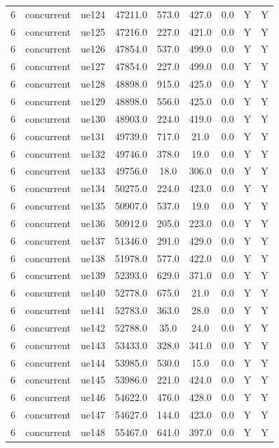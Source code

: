\begin{table}[ht]
\begin{tabular}{|c|c|c|c|c|c|c|c|c|}
6 & concurrent & ue124 & 47211.0 & 573.0 & 427.0 & 0.0 & Y & Y \\
6 & concurrent & ue125 & 47216.0 & 227.0 & 421.0 & 0.0 & Y & Y \\
6 & concurrent & ue126 & 47854.0 & 537.0 & 499.0 & 0.0 & Y & Y \\
6 & concurrent & ue127 & 47854.0 & 227.0 & 499.0 & 0.0 & Y & Y \\
6 & concurrent & ue128 & 48898.0 & 915.0 & 425.0 & 0.0 & Y & Y \\
6 & concurrent & ue129 & 48898.0 & 556.0 & 425.0 & 0.0 & Y & Y \\
6 & concurrent & ue130 & 48903.0 & 224.0 & 419.0 & 0.0 & Y & Y \\
6 & concurrent & ue131 & 49739.0 & 717.0 & 21.0 & 0.0 & Y & Y \\
6 & concurrent & ue132 & 49746.0 & 378.0 & 19.0 & 0.0 & Y & Y \\
6 & concurrent & ue133 & 49756.0 & 18.0 & 306.0 & 0.0 & Y & Y \\
6 & concurrent & ue134 & 50275.0 & 224.0 & 423.0 & 0.0 & Y & Y \\
6 & concurrent & ue135 & 50907.0 & 537.0 & 19.0 & 0.0 & Y & Y \\
6 & concurrent & ue136 & 50912.0 & 205.0 & 223.0 & 0.0 & Y & Y \\
6 & concurrent & ue137 & 51346.0 & 291.0 & 429.0 & 0.0 & Y & Y \\
6 & concurrent & ue138 & 51978.0 & 577.0 & 422.0 & 0.0 & Y & Y \\
6 & concurrent & ue139 & 52393.0 & 629.0 & 371.0 & 0.0 & Y & Y \\
6 & concurrent & ue140 & 52778.0 & 675.0 & 21.0 & 0.0 & Y & Y \\
6 & concurrent & ue141 & 52783.0 & 363.0 & 28.0 & 0.0 & Y & Y \\
6 & concurrent & ue142 & 52788.0 & 35.0 & 24.0 & 0.0 & Y & Y \\
6 & concurrent & ue143 & 53433.0 & 328.0 & 341.0 & 0.0 & Y & Y \\
6 & concurrent & ue144 & 53985.0 & 530.0 & 15.0 & 0.0 & Y & Y \\
6 & concurrent & ue145 & 53986.0 & 221.0 & 424.0 & 0.0 & Y & Y \\
6 & concurrent & ue146 & 54622.0 & 476.0 & 428.0 & 0.0 & Y & Y \\
6 & concurrent & ue147 & 54627.0 & 144.0 & 423.0 & 0.0 & Y & Y \\
6 & concurrent & ue148 & 55467.0 & 641.0 & 397.0 & 0.0 & Y & Y \\

\end{tabular}
\end{table}
